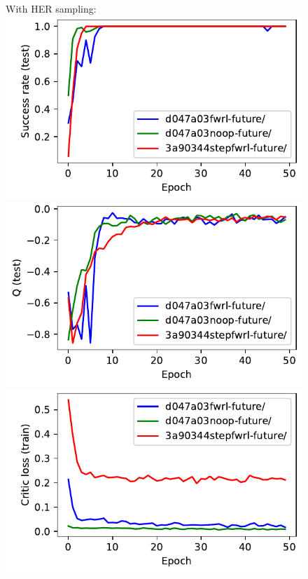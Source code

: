 %
\begin{figure}%
  \def\frac{0.24}
  With HER sampling:\\
  \includegraphics[width=\frac\columnwidth]{media/res/3a90344-FetchReach-v1-stepfwrl-future/test/success_rate.pdf}%
  \includegraphics[width=\frac\columnwidth]{media/res/3a90344-FetchReach-v1-stepfwrl-future/test/mean_Q.pdf}%
  \includegraphics[width=\frac\columnwidth]{media/res/3a90344-FetchReach-v1-stepfwrl-future/train/critic_loss.pdf}%

\end{figure}
